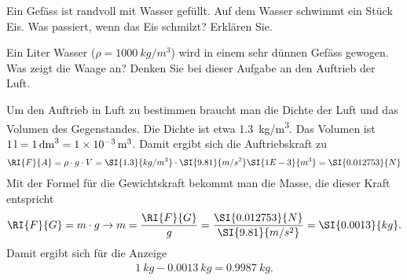 \begin{aufgabe}
	Ein Gefäss ist randvoll mit Wasser gefüllt. Auf dem Wasser schwimmt ein Stück Eis.
	Was passiert, wenn das Eis schmilzt? Erklären Sie.
\end{aufgabe}

\begin{aufgabe}
	Ein Liter Wasser ($\rho=\SI{1000}{kg/m^3}$) wird in einem sehr dünnen Gefäss gewogen. 
	Was zeigt die Waage an? Denken Sie bei dieser Aufgabe an den Auftrieb der Luft.


	\begin{loesung}
		Um den Auftrieb in Luft zu bestimmen braucht man die Dichte der Luft und das Volumen
		des Gegenstandes. Die Dichte ist etwa \SI{1.3}{kg/m^3}. Das Volumen ist $\SI{1}{l}=\SI{1}{dm^3}=\SI{1E-3}{m^3}$.
		Damit ergibt sich die Auftriebskraft zu
		\begin{eqnarray*}
			\RI{F}{A}=\rho\cdot g \cdot V=\SI{1.3}{kg/m^3}\cdot\SI{9.81}{m/s^2}\SI{1E-3}{m^3}=\SI{0.012753}{N}
		\end{eqnarray*}
		Mit der Formel für die Gewichtskraft bekommt man die Masse, die dieser Kraft entspricht
		\begin{eqnarray*}
			\RI{F}{G}=m\cdot g\to m=\frac{\RI{F}{G}}{g}=\frac{\SI{0.012753}{N}}{\SI{9.81}{m/s^2}}=\SI{0.0013}{kg}\text{.}
		\end{eqnarray*}
		Damit ergibt sich für die Anzeige
		\begin{eqnarray*}
			\SI{1}{kg}-\SI{0.0013}{kg}=\SI{0.9987}{kg}\text{.}
		\end{eqnarray*}
	\end{loesung}

\end{aufgabe}


